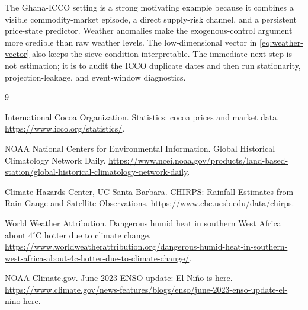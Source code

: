 \documentclass[11pt]{article}
\begin{document}
The Ghana-ICCO setting is a strong motivating example because it combines a visible commodity-market episode, a direct supply-risk channel, and a persistent price-state predictor. Weather anomalies make the exogenous-control argument more credible than raw weather levels. The low-dimensional vector in \eqref{eq:weather-vector} also keeps the sieve condition interpretable. The immediate next step is not estimation; it is to audit the ICCO duplicate dates and then run stationarity, projection-leakage, and event-window diagnostics.

\begin{thebibliography}{9}

International Cocoa Organization.
\newblock Statistics: cocoa prices and market data.
\newblock \url{https://www.icco.org/statistics/}.

NOAA National Centers for Environmental Information.
\newblock Global Historical Climatology Network Daily.
\newblock \url{https://www.ncei.noaa.gov/products/land-based-station/global-historical-climatology-network-daily}.

Climate Hazards Center, UC Santa Barbara.
\newblock CHIRPS: Rainfall Estimates from Rain Gauge and Satellite Observations.
\newblock \url{https://www.chc.ucsb.edu/data/chirps}.

World Weather Attribution.
\newblock Dangerous humid heat in southern West Africa about \(4^\circ\)C hotter due to climate change.
\newblock \url{https://www.worldweatherattribution.org/dangerous-humid-heat-in-southern-west-africa-about-4c-hotter-due-to-climate-change/}.

NOAA Climate.gov.
\newblock June 2023 ENSO update: El Ni\~no is here.
\newblock \url{https://www.climate.gov/news-features/blogs/enso/june-2023-enso-update-el-nino-here}.

\end{thebibliography}
\end{document}
